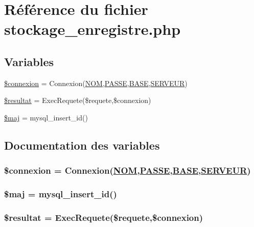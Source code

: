 \hypertarget{stockage__enregistre_8php}{
\section{R\'{e}f\'{e}rence du fichier stockage\_\-enregistre.php}
\label{stockage__enregistre_8php}
}
\subsection*{Variables}
\begin{CompactItemize}
\item 
\hyperlink{stockage__enregistre_8php_a0}{\$connexion} = Connexion(\hyperlink{pma__connect_8php_a0}{NOM},\hyperlink{pma__connect_8php_a1}{PASSE},\hyperlink{pma__connect_8php_a3}{BASE},\hyperlink{pma__connect_8php_a2}{SERVEUR})
\item 
\hyperlink{stockage__enregistre_8php_a1}{\$resultat} = Exec\-Requete(\$requete,\$connexion)
\item 
\hyperlink{stockage__enregistre_8php_a2}{\$maj} = mysql\_\-insert\_\-id()
\end{CompactItemize}


\subsection{Documentation des variables}
\hypertarget{stockage__enregistre_8php_a0}{
\subsubsection[\$connexion]{\setlength{\rightskip}{0pt plus 5cm}\$connexion = Connexion(\hyperlink{pma__connect_8php_a0}{NOM},\hyperlink{pma__connect_8php_a1}{PASSE},\hyperlink{pma__connect_8php_a3}{BASE},\hyperlink{pma__connect_8php_a2}{SERVEUR})}}
\label{stockage__enregistre_8php_a0}


\hypertarget{stockage__enregistre_8php_a2}{
\subsubsection[\$maj]{\setlength{\rightskip}{0pt plus 5cm}\$maj = mysql\_\-insert\_\-id()}}
\label{stockage__enregistre_8php_a2}


\hypertarget{stockage__enregistre_8php_a1}{
\subsubsection[\$resultat]{\setlength{\rightskip}{0pt plus 5cm}\$resultat = Exec\-Requete(\$requete,\$connexion)}}
\label{stockage__enregistre_8php_a1}


